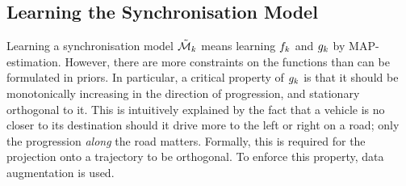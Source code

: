 

\subsection{Learning the Synchronisation Model}
Learning a synchronisation model $\tilde{\mathcal{M}}_{k}$ means learning
$f_{k}$ and $g_{k}$ by MAP-estimation. However, there are
more constraints on the functions than can be formulated in
priors. In particular, a critical property of $g_{k}$
is that it should be monotonically increasing in the direction of progression,
and stationary orthogonal to it. This is intuitively explained by the fact that a
vehicle is no closer to its destination should it drive more to the
left or right on a road; only the progression \textit{along} the road
matters. Formally, this is required for the projection onto a
trajectory to be orthogonal. To enforce this property, data augmentation is used.

